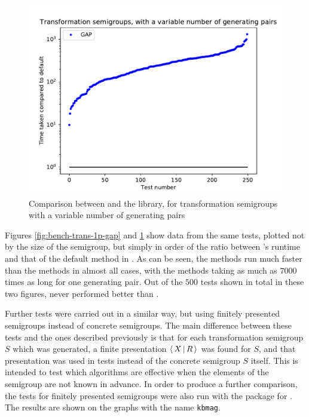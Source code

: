 \begin{figure}[p]
  \centering
  \includegraphics[width=\textwidth]{pics/ch-pairs/bench-trans-vp-gap}
  \caption[Benchmark: \GAP{}/\libsemigroups{}, concrete, $n$ pairs]
  {Comparison between \libsemigroups{} and the \GAP{} library, for
    transformation semigroups with a variable number of generating pairs}
  \label{fig:bench-trans-vp-gap}
\end{figure}

Figures \ref{fig:bench-trans-1p-gap} and \ref{fig:bench-trans-vp-gap} show data
from the same tests, plotted not by
the size of the semigroup, but simply in order of the ratio between \GAP{}'s
runtime and that of the default method in \libsemigroups{}.  As can be
seen, the \libsemigroups{} methods run much faster than the \GAP{} methods in
almost all cases, with the \GAP{} methods taking as much as $7000$ times as long
for one generating pair.  Out of the $500$ tests shown in total in these two
figures, \GAP{} never performed better than \libsemigroups{}.

Further tests were carried out in a similar way, but using finitely presented
semigroups instead of concrete semigroups.  The main difference between these
tests and the ones described previously is that for each transformation
semigroup $S$ which was generated, a finite presentation $\left\langle\,X\,\middle|\,R\,\right\rangle$ was found
for $S$, and that presentation was used in tests instead of the concrete
semigroup $S$ itself.  This is intended to test which algorithms are effective
when the elements of the semigroup are not known in advance.
In order to produce a further comparison, the tests for finitely presented
semigroups were also run with the \kbmag{} package for \GAP{} \cite{kbmag}.
The results are shown on the graphs with the name \texttt{kbmag}.

